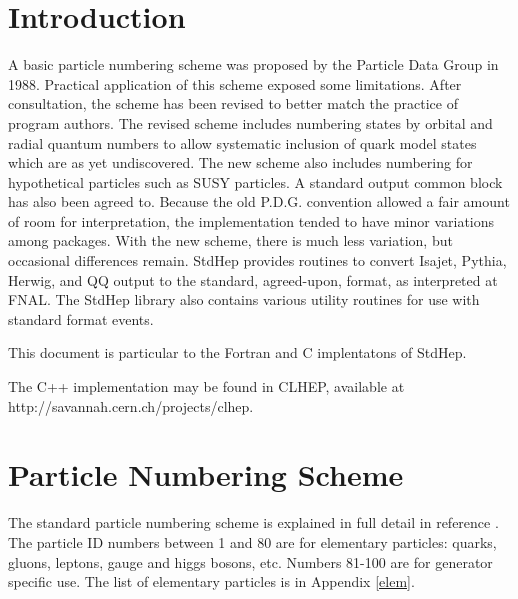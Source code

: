 
\section {  Introduction }

A basic particle numbering scheme was proposed by the Particle Data
Group in 1988\cite{pdg88}.  
Practical application of this scheme exposed some limitations.
After consultation\cite{knowles}, the scheme has been revised to 
better match the practice of program authors.  The revised scheme
includes numbering states by orbital and radial quantum numbers
to allow systematic inclusion of quark model states which are
as yet undiscovered.  The new scheme also includes numbering for
hypothetical particles such as SUSY particles.
A standard output common block \cite{hepevt} has also been agreed to.  
Because the old P.D.G. convention allowed a fair amount of room for 
interpretation,
the implementation tended to have minor variations among packages.
With the new scheme, there is much less variation, but occasional differences
remain.  StdHep provides routines to convert 
Isajet, Pythia, Herwig, and QQ output to the standard, agreed-upon, format,
as interpreted at FNAL.  The StdHep library also contains various utility
routines for use with standard format events.

This document is particular to the Fortran and C implentatons of StdHep.

The C++ implementation may be found in CLHEP\cite{clhep}, 
available at http://savannah.cern.ch/projects/clhep.

\section { Particle Numbering Scheme }

The standard particle numbering scheme is explained in full detail in
reference \cite{newscheme}.
The particle ID numbers between 1 and 80 are for elementary particles:
quarks, gluons, leptons, gauge and higgs bosons, etc.
Numbers 81-100 are for generator specific use.
The list of elementary particles is in Appendix \ref{elem}.

